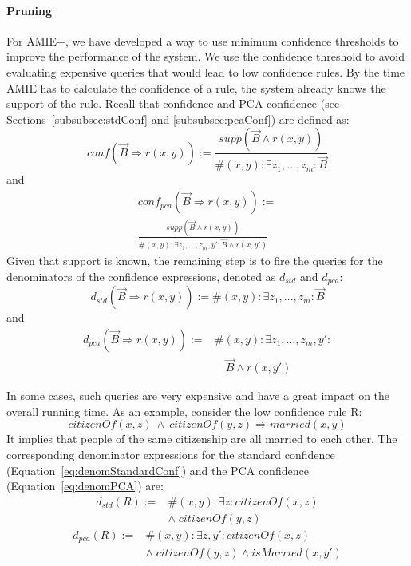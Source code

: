{\paragraph{Pruning} 
For AMIE+, we have developed a way to use minimum confidence thresholds to improve the performance of the system.  
We use the confidence threshold to avoid evaluating expensive queries that would lead to low confidence rules.
By the time AMIE has to calculate the confidence of a rule, the system already knows the support of the rule.
Recall that confidence and PCA confidence (see Sections~\ref{subsubsec:stdConf} and \ref{subsubsec:pcaConf}) are defined as:
\[conf(\vec{B} \Rightarrow r(x,y)) := \frac{supp(\vec{B} \wedge r(x,y))}{\#(x,y): \exists z_1,...,z_m: \vec{B}}\]
and
\begin{multline*}
conf_{pca}(\vec{B} \Rightarrow r(x,y)) :=\\
\frac{supp(\vec{B} \wedge r(x,y))}{\#(x,y): \exists z_1,...,z_m,y': \vec{B} \wedge r(x,y')}
\end{multline*}
\noindent Given that support is known, the remaining step is to fire the queries for the denominators of the confidence expressions, denoted as $d_{std}$ and $d_{pca}$:
\begin{equation} \label{eq:denomStandardConf}
 d_{std}(\vec{B} \Rightarrow r(x,y)):= \#(x,y): \exists z_1,...,z_m: \vec{B}
\end{equation}
and
\begin{equation} \label{eq:denomPCA}
\begin{array}{rl}
d_{pca}(\vec{B} \Rightarrow r(x,y)) := {}& \#(x,y): \exists z_1,...,z_m,y': \\ &\quad \vec{B} \wedge r(x,y')
\end{array}
\end{equation}

\noindent In some cases, such queries are very expensive and have a great impact on the overall running time. As an example,
consider the low confidence rule R: \[citizenOf(x,z)\:\wedge\:citizenOf(y,z) \Rightarrow married(x,y)\]
It implies that people of the same citizenship are all married to each other.
The corresponding denominator expressions for the standard confidence (Equation~\ref{eq:denomStandardConf}) and the PCA confidence (Equation~\ref{eq:denomPCA}) are:
\begin{equation*}
\begin{array}{rl}
d_{std}(R) := & \#(x,y): \exists z: citizenOf(x,z)\\ & \wedge\; citizenOf(y,z)
\end{array}
\label{eq:denomStandardCofn}
\end{equation*}
\begin{equation*}
\begin{array}{rl}
d_{pca}(R) := &\#(x,y): \exists z, y': citizenOf(x,z)  \\
  &\wedge\; citizenOf(y,z) \wedge isMarried(x,y') \label{eq:denomPCA}
\end{array}
\end{equation*}

}
